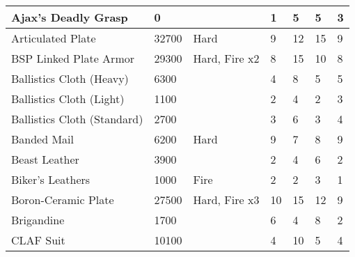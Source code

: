 \documentclass[twoside]{book}
\begin{document}
\begin{longtable}{p{1.25in}llp{2em}p{2em}p{2em}p{2em}}
  \raggedright
           Ajax's Deadly Grasp
           
  &
   0 
  &
  
  &
   1 
  &
   5 
  &
   5 
  &
   3 
  \tabularnewline
  \hline
      
  \raggedright
           Articulated Plate 
  &
   32700 
  &
   Hard 
  &
   9 
  &
   12 
  &
   15 
  &
   9 
  \tabularnewline
  \hline
      
  \raggedright
           BSP Linked Plate Armor 
  &
   29300 
  &
   Hard, Fire x2 
  &
   8 
  &
   15 
  &
   10 
  &
   8 
  \tabularnewline
  \hline
      
  \raggedright
           Ballistics Cloth (Heavy)
           
  &
   6300 
  &
  
  &
   4 
  &
   8 
  &
   5 
  &
   5 
  \tabularnewline
  \hline
      
  \raggedright
           Ballistics Cloth (Light)
           
  &
   1100 
  &
  
  &
   2 
  &
   4 
  &
   2 
  &
   3 
  \tabularnewline
  \hline
      
  \raggedright
           Ballistics Cloth (Standard)
           
  &
   2700 
  &
  
  &
   3 
  &
   6 
  &
   3 
  &
   4 
  \tabularnewline
  \hline
      
  \raggedright
           Banded Mail 
  &
   6200 
  &
   Hard 
  &
   9 
  &
   7 
  &
   8 
  &
   9 
  \tabularnewline
  \hline
      
  \raggedright
           Beast Leather 
  &
   3900 
  &
  
  &
   2 
  &
   4 
  &
   6 
  &
   2 
  \tabularnewline
  \hline
      
  \raggedright
           Biker's Leathers 
  &
   1000 
  &
   Fire 
  &
   2 
  &
   2 
  &
   3 
  &
   1 
  \tabularnewline
  \hline
      
  \raggedright
           Boron-Ceramic Plate 
  &
   27500 
  &
   Hard, Fire x3 
  &
   10 
  &
   15 
  &
   12 
  &
   9 
  \tabularnewline
  \hline
      
  \raggedright
           Brigandine 
  &
   1700 
  &
  
  &
   6 
  &
   4 
  &
   8 
  &
   2 
  \tabularnewline
  \hline
      
  \raggedright
           CLAF Suit 
  &
   10100 
  &
  
  &
   4 
  &
   10 
  &
   5 
  &
   4 
  \tabularnewline
  \hline
      

\end{longtable}
\end{document}
